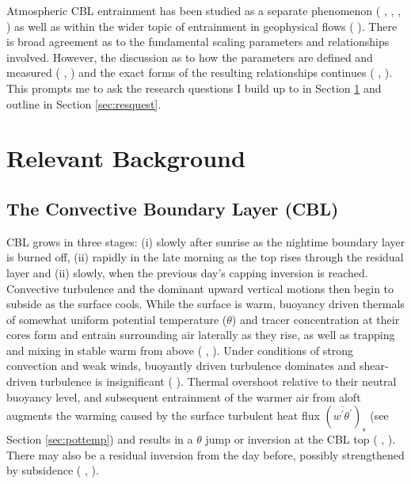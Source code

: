Atmospheric \acs{CBL} entrainment has been studied as a separate phenomenon (\citeauthor{StullNelEl} \citeyear{StullNelEl}, \citeauthor{SullMoengStev} \citeyear{SullMoengStev}, \citeauthor{FedConzMir04} \citeyear{FedConzMir04}, \citeauthor{BrooksFowler2} \citeyear{BrooksFowler2}) as well as within the wider topic of entrainment in geophysical flows (\citeauthor{Turner86} \citeyear{Turner86}). There is broad agreement as to the fundamental scaling parameters and relationships involved.  However, the discussion as to how the parameters are defined and measured (\citeauthor{BrooksFowler2} \citeyear{BrooksFowler2}, \citeauthor{Traum11} \citeyear{Traum11}) and the exact forms of the resulting relationships continues (\citeauthor{SullMoengStev} \citeyear{SullMoengStev}, \citeauthor{FedConzMir04} \citeyear{FedConzMir04} \citeauthor{BrooksFowler2} \citeyear{BrooksFowler2}).  This prompts me to ask the research questions I build up to in Section \ref{sec:relback} and outline in Section \ref{sec:resquest}.


\section{Relevant Background}
\label{sec:relback}
\subsection{The Convective Boundary Layer (CBL)}

\acs{CBL} grows in three stages: (i) slowly after sunrise as the nightime boundary layer is burned off, (ii) rapidly in the late morning as the top rises through the residual layer and (ii) slowly, when the previous day's capping inversion is reached.  Convective turbulence and the dominant upward vertical motions then begin to subside as the surface cools.  While the surface is warm, buoyancy driven thermals of somewhat uniform potential temperature ($\theta$) and tracer concentration at their cores form and entrain surrounding air laterally as they rise, as well as trapping and mixing in stable warm from above (\citeauthor{Stull-BLMetIntro} \citeyear{Stull-BLMetIntro}, \citeauthor{CrumStullEl} \citeyear{CrumStullEl}).  Under conditions of strong convection and weak winds, buoyantly driven turbulence dominates and shear-driven turbulence is insignificant (\citeauthor{DirLEddy} \citeyear{DirLEddy}). Thermal overshoot relative to their neutral buoyancy level, and subsequent entrainment of the warmer air from aloft augments the warming caused by the surface turbulent heat flux $(\overline{w^{'}\theta^{'}})_{s}$ (see Section \ref{sec:pottemp}) and results in a $\theta$ jump or inversion at the \acs{CBL} top (\citeauthor{SchmidtSchu} \citeyear{SchmidtSchu}, \citeauthor{Turner86} \citeyear{Turner86}).  There may also be a residual inversion from the day before, possibly strengthened by subsidence (\citeauthor{Stull-BLMetIntro} \citeyear{Stull-BLMetIntro}, \citeauthor{SullMoengStev} \citeyear{SullMoengStev}).\\  

